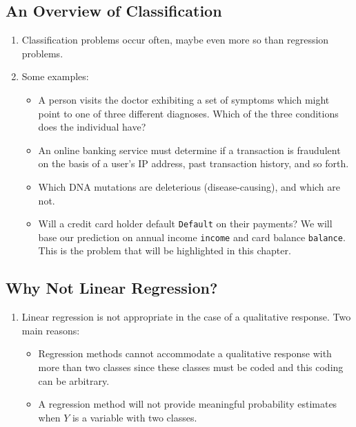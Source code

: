 \documentclass[10pt]{article}
\begin{document}
\subsection{An Overview of Classification} 
\begin{enumerate}
	\item Classification problems occur often, maybe even more so than regression problems.
	\item Some examples: \begin{itemize}
		\item A person visits the doctor exhibiting a set of symptoms which might point to one of three different diagnoses.  Which of the three conditions does the individual have?
		\item An online banking service must determine if a transaction is fraudulent on the basis of a user's IP address, past transaction history, and so forth.
		\item Which DNA mutations are deleterious (disease-causing), and which are not.
		\item Will a credit card holder default {\tt Default} on their payments?  We will base our prediction on annual income {\tt income} and card balance {\tt balance}.  This is the problem that will be highlighted in this chapter.
	\end{itemize}
\end{enumerate}

\vspace{.2in} 

\subsection{Why Not Linear Regression?}
\begin{enumerate}
	\item Linear regression is not appropriate in the case of a qualitative response.  Two main reasons: \begin{itemize}
		\item Regression methods cannot accommodate a qualitative response with more than two classes since these classes must be coded and this coding can be arbitrary.
		\item A regression method will not provide meaningful probability estimates when $Y$ is a variable with two classes.
	\end{itemize}
\end{enumerate}

\vspace{.2in} 
\end{document}
